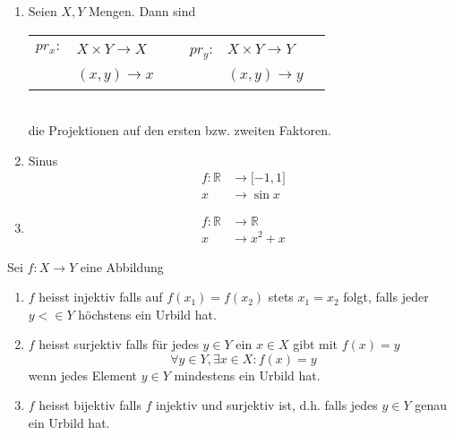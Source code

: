 \begin{enumerate}
\item Seien $X,Y$ Mengen. Dann sind \\
\begin{tabular}{r  l c r l c }
$pr_x:$ & $X\times Y\rightarrow X $& ~ & $pr_y$: & $X\times Y\rightarrow Y$ \\
~& $(x,y)\rightarrow x$ & ~& ~& $(x,y)\rightarrow y$ \\
\end{tabular}\\
die Projektionen auf den ersten bzw. zweiten Faktoren. 
\item Sinus \begin{align*} f:\mathbb{R}&\rightarrow\lbrack -1,1\rbrack \\ x &\rightarrow \sin x \end{align*}
\item \begin{align*}f:\mathbb{R}&\rightarrow\mathbb{R} \\ x&\rightarrow x^2+x\end{align*}
\end{enumerate}
\begin{definition}{1.11}
Sei $f:X\rightarrow Y$ eine Abbildung
\begin{enumerate}
\item $f$ heisst injektiv falls auf $f(x_1)=f(x_2)$ stets $x_1=x_2$ folgt, falls jeder $y<\in Y$ höchstens ein Urbild hat.
\item $f$ heisst surjektiv falls für jedes $y\in Y$ ein $x\in X$ gibt mit $f(x)=y$ \[\forall y\in Y, \exists x\in X:f(x)=y\]wenn jedes Element $y\in Y$ mindestens ein Urbild hat. 
\item $f$ heisst bijektiv falls $f$ injektiv und surjektiv ist, d.h. falls jedes $y\in Y$ genau ein Urbild hat. 
\end{enumerate}
\end{definition}

